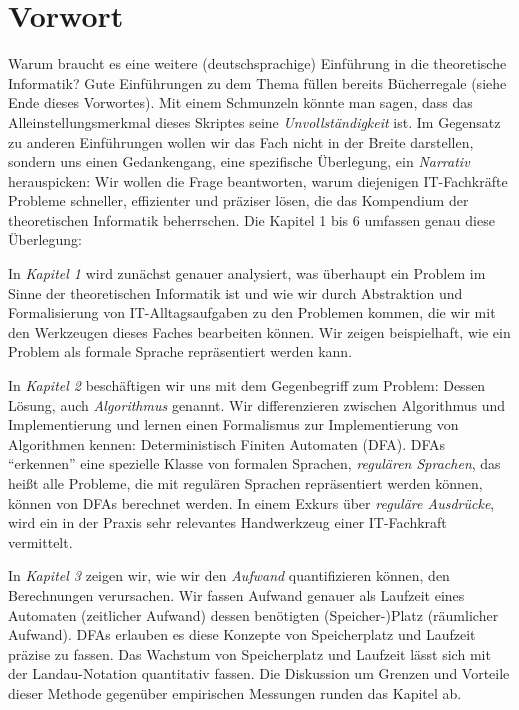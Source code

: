 \chapter{Vorwort}

Warum braucht es eine weitere (deutschsprachige) Einführung
in die theoretische Informatik?
Gute Einführungen zu dem Thema füllen bereits Bücherregale
(siehe Ende dieses Vorwortes).
Mit einem Schmunzeln könnte man sagen,
dass das Alleinstellungsmerkmal dieses Skriptes seine
\emph{Unvollständigkeit} ist.
Im Gegensatz zu anderen Einführungen wollen wir das Fach nicht in der Breite darstellen,
sondern uns einen Gedankengang, eine spezifische Überlegung,
ein \emph{Narrativ} herauspicken:
Wir wollen die Frage beantworten,
warum diejenigen IT-Fachkräfte Probleme
schneller, effizienter und präziser lösen,
die das Kompendium der theoretischen Informatik beherrschen.
Die Kapitel 1 bis 6 umfassen genau diese Überlegung:

In \emph{Kapitel 1} wird zunächst genauer analysiert,
was überhaupt ein Problem im Sinne der theoretischen Informatik ist
und wie wir durch Abstraktion und Formalisierung von IT-Alltagsaufgaben
zu den Problemen kommen, die wir mit den Werkzeugen dieses Faches bearbeiten können.
Wir zeigen beispielhaft,
wie ein Problem als formale Sprache repräsentiert werden kann.

In \emph{Kapitel 2} beschäftigen wir uns mit dem Gegenbegriff zum Problem:
Dessen Lösung, auch \emph{Algorithmus} genannt.
Wir differenzieren zwischen Algorithmus und Implementierung
und lernen einen Formalismus zur Implementierung von Algorithmen kennen:
Deterministisch Finiten Automaten (DFA).
DFAs ``erkennen'' eine spezielle Klasse von formalen Sprachen,
\emph{regulären Sprachen},
das heißt alle Probleme, die mit regulären Sprachen repräsentiert werden können,
können von DFAs berechnet werden.
In einem Exkurs über \emph{reguläre Ausdrücke},
wird ein in der Praxis sehr relevantes Handwerkzeug einer IT-Fachkraft vermittelt.

In \emph{Kapitel 3} zeigen wir, 
wie wir den \emph{Aufwand} quantifizieren können,
den Berechnungen verursachen. 
Wir fassen Aufwand genauer als Laufzeit eines Automaten (zeitlicher Aufwand) 
dessen benötigten (Speicher-)Platz (räumlicher Aufwand).
DFAs erlauben es diese Konzepte von Speicherplatz und Laufzeit präzise zu fassen.
Das Wachstum von Speicherplatz und Laufzeit lässt sich
mit der Landau-Notation quantitativ fassen.
Die Diskussion um Grenzen und Vorteile dieser Methode
gegenüber empirischen Messungen runden das Kapitel ab.

